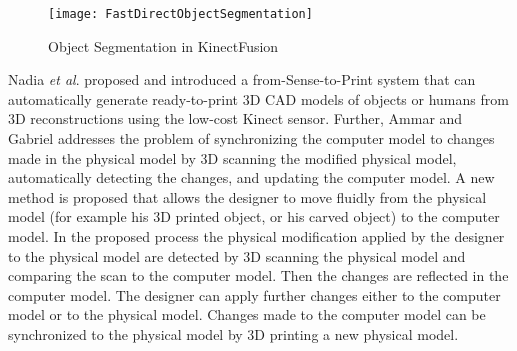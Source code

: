 %
\begin{figure}[t]
\centering
\texttt{[image: FastDirectObjectSegmentation]}
\caption{Object Segmentation in KinectFusion \cite{KinectFusionIzadi_2011}}
\label{FastDirectObjectSegmentation}
\end{figure}%
%
Nadia \textit{et al}. \cite{3DPrintingFrom3DSensing13} proposed and introduced a from-Sense-to-Print system that can automatically generate ready-to-print 3D CAD models of objects or humans from 3D reconstructions using the low-cost Kinect sensor. Further, Ammar and Gabriel \cite{3DModelingForPrinting15} addresses the problem of synchronizing the computer model to changes made in the physical model by 3D scanning the modified physical model, automatically detecting the changes, and updating the computer model. A new method is proposed that allows the designer to move fluidly from the physical model (for example his 3D printed object, or his carved object) to the computer model. In the proposed process the physical modification applied by the designer to the physical model are detected by 3D scanning the physical model and comparing the scan to the computer model. Then the changes are reflected in the computer model. The designer can apply further changes either to the computer model or to the physical model. Changes made to the computer model can be synchronized to the physical model by 3D printing a new physical model.
%
%
